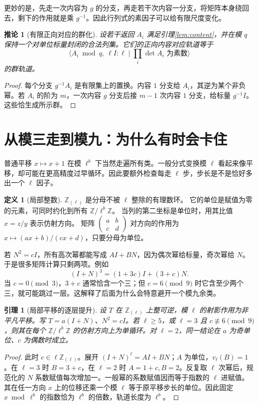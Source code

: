 \documentclass[11pt,a4paper,oneside,openany]{book}
\newcommand{\Z}{\mathbb Z}
\newtheorem{lemma}[theorem]{引理}
\newtheorem{corollary}[theorem]{推论}
\theoremstyle{definition}
\newtheorem{definition}[theorem]{定义}
\numberwithin{equation}{chapter}
\begin{document}
更妙的是，先走一次内容为 $g$ 的分支，再走若干次内容一分支，将矩阵本身绕回去，剩下的作用就是乘 $g^{-1}$。因此行列式的素因子可以给有限尺度变化。
\begin{corollary}[有限正向对应的群化]\label{cor:finite-group}
设若干返回 $A_i$ 满足引理\ref{lem:content}，并在模 $q$ 保持一个对单位标量封闭的合法列集。它们的正向内容对应轨道等于
\[
\langle A_i\bmod q,\ \ell I:\ell\mid\prod_i\det A_i\text{ 为素数}\rangle
\]
的群轨道。
\end{corollary}
\begin{proof}
每个分支 $g^{-1}A_i$ 是有限集上的置换。内容 $1$ 分支给 $A_i$，其逆为某个非负幂。若 $A_i$ 的阶为 $m$，一次内容 $g$ 分支后接 $m-1$ 次内容 $1$ 分支，给标量 $g^{-1}I$。这些恰生成所示群。
\end{proof}

\section{从模三走到模九：为什么有时会卡住}
普通平移 $x\mapsto x+1$ 在模 $\ell^b$ 下当然走遍所有类。一般分式变换模 $\ell$ 看起来像平移，却可能在更高精度过早循环。因此要额外检查每走 $\ell$ 步，步长是不是恰好多出一个 $\ell$ 因子。
\begin{definition}[局部整数]
$\Z_{(\ell)}$ 是分母不被 $\ell$ 整除的有理数环。
它的单位是赋值为零的元素，可同时约化到所有 $\Z/\ell^b\Z$。
当列的第二坐标是单位时，用其比值 $x=z/y$ 表示仿射方向。
矩阵 $\left(\begin{smallmatrix}a&b\\c&d\end{smallmatrix}\right)$ 对方向的作用为
$x\mapsto(ax+b)/(cx+d)$，只要分母为单位。
\end{definition}
若 $N^2=cI$，所有高次幂都能写成 $A I+B N$，因为偶次幂给标量，奇次幂给 $N$。于是很多矩阵计算只剩两项。例如
\[(I+N)^3=(1+3c)I+(3+c)N.
\]
当 $c=0\pmod3$，$3+c$ 通常恰含一个三；但 $c=6\pmod9$ 时它含至少两个三，就可能跳过一层。这解释了后面为什么会特意避开一个模九余类。
\begin{lemma}[局部平移的逐层提升]\label{lem:local-cycle}
设 $T$ 在 $\Z_{(\ell)}$ 上整可逆，模 $\ell$ 的射影作用为非平凡平移。写 $T=a(I+N)$、$N^2=cI$。若 $\ell\ge5$，或 $\ell=3$ 且 $c\not\equiv6\pmod9$，则其在每个 $\Z/\ell^b\Z$ 的仿射方向上为单循环。对 $\ell=2$，同一结论在 $a$ 为奇单位、$c$ 为偶数时成立。
\end{lemma}
\begin{proof}
此时 $c\in\ell\Z_{(\ell)}$。展开 $(I+N)^\ell=A I+B N$；$A$ 为单位，$v_\ell(B)=1$。在 $\ell=3$ 时 $B=3+c$，在 $\ell=2$ 时 $A=1+c,B=2$。反复取 $\ell$ 次幂后，规范化的 $N$ 系数赋值每次增加一。一般幂的系数赋值因而等于指数的 $\ell$ 进赋值。其在任一方向 $x$ 上的位移还乘一个模 $\ell$ 等于原平移步长的单位。因此固定 $x\bmod\ell^b$ 的指数恰为 $\ell^b$ 的倍数，轨道长度为 $\ell^b$。
\end{proof}
\end{document}

